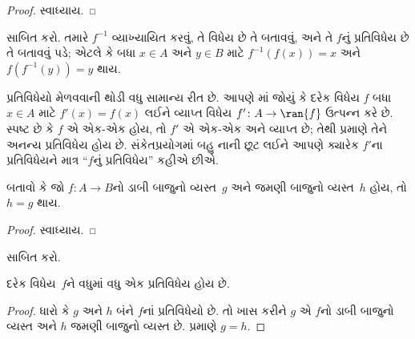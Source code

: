 \begin{proof}
સ્વાધ્યાય.
\end{proof}

\begin{prob}
 સાબિત કરો.
તમારે $f^{-1}$ વ્યાખ્યાયિત કરવું, તે વિધેય છે તે
બતાવવું, અને તે $f$નું પ્રતિવિધેય છે તે બતાવવું પડે;
એટલે કે બધા $x \in A$ અને $y \in B$ માટે
$f^{-1}(f(x)) = x$ અને $f(f^{-1}(y)) = y$ થાય.
\end{prob}

\begin{explain}
પ્રતિવિધેયો મેળવવાની થોડી વધુ સામાન્ય રીત છે.
આપણે માં જોયું કે દરેક વિધેય $f$
બધા $x \in A$ માટે $f'(x) = f(x)$ લઈને
વ્યાપ્ત વિધેય $f'
\colon A \to \ran{f}$ ઉત્પન્ન કરે છે.
સ્પષ્ટ છે કે $f$ એ એક-એક હોય, તો
$f'$ એ એક-એક અને વ્યાપ્ત છે; તેથી
 પ્રમાણે તેને અનન્ય
પ્રતિવિધેય હોય છે. સંકેતપ્રયોગમાં બહુ નાની છૂટ લઈને
આપણે ક્યારેક $f'$ના પ્રતિવિધેયને માત્ર
“$f$નું પ્રતિવિધેય” કહીએ છીએ.
\end{explain}

\begin{prop}%
બતાવો કે જો $f\colon A \to B$નો ડાબી બાજુનો
વ્યસ્ત~$g$ અને જમણી બાજુનો વ્યસ્ત~$h$ હોય,
તો $h = g$ થાય.
\end{prop}

\begin{proof}
સ્વાધ્યાય.
\end{proof}

\begin{prob}
 સાબિત કરો.
\end{prob}

\begin{prop}
દરેક વિધેય~$f$ને વધુમાં વધુ એક પ્રતિવિધેય હોય છે.
\end{prop}

\begin{proof}
ધારો કે $g$ અને $h$ બંને $f$નાં પ્રતિવિધેયો છે.
તો ખાસ કરીને $g$ એ $f$નો ડાબી બાજુનો વ્યસ્ત
અને $h$ જમણી બાજુનો વ્યસ્ત છે.
 પ્રમાણે $g = h$.
\end{proof}
\endgroup


\begingroup
\makeatletter{}\makeatother

\label{guunit:OLP-0025}



